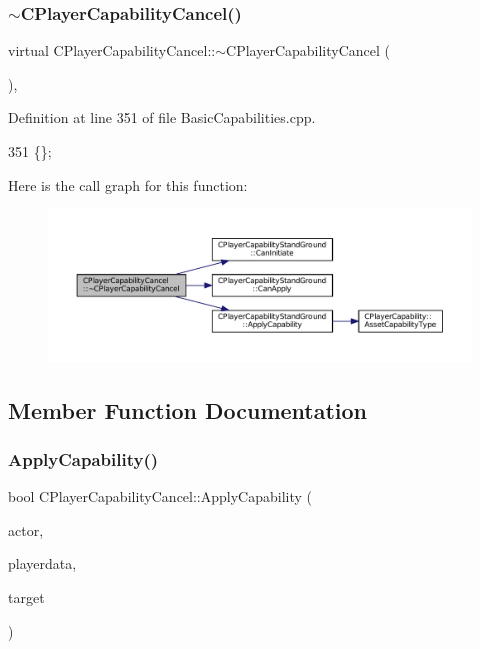 \subsubsection{\texorpdfstring{$\sim$\+C\+Player\+Capability\+Cancel()}{~CPlayerCapabilityCancel()}}
{\footnotesize\ttfamily virtual C\+Player\+Capability\+Cancel\+::$\sim$\+C\+Player\+Capability\+Cancel (\begin{DoxyParamCaption}{ }\end{DoxyParamCaption})\hspace{0.3cm}{\ttfamily [inline]}, {\ttfamily [virtual]}}



Definition at line 351 of file Basic\+Capabilities.\+cpp.


\begin{DoxyCode}
351 \{\};
\end{DoxyCode}
Here is the call graph for this function\+:\nopagebreak
\begin{figure}[H]
\begin{center}
\leavevmode
\includegraphics[width=350pt]{classCPlayerCapabilityCancel_a354db8bd423b9bf6959de288177db049_cgraph}
\end{center}
\end{figure}


\subsection{Member Function Documentation}
\hypertarget{classCPlayerCapabilityCancel_a8f738ac375bf5d1e7f8b768bce16b946}{}\label{classCPlayerCapabilityCancel_a8f738ac375bf5d1e7f8b768bce16b946} 
\subsubsection{\texorpdfstring{Apply\+Capability()}{ApplyCapability()}}
{\footnotesize\ttfamily bool C\+Player\+Capability\+Cancel\+::\+Apply\+Capability (\begin{DoxyParamCaption}\item[{std\+::shared\+\_\+ptr$<$ \hyperlink{classCPlayerAsset}{C\+Player\+Asset} $>$}]{actor,  }\item[{std\+::shared\+\_\+ptr$<$ \hyperlink{classCPlayerData}{C\+Player\+Data} $>$}]{playerdata,  }\item[{std\+::shared\+\_\+ptr$<$ \hyperlink{classCPlayerAsset}{C\+Player\+Asset} $>$}]{target }\end{DoxyParamCaption})\hspace{0.3cm}{\ttfamily [virtual]}}



